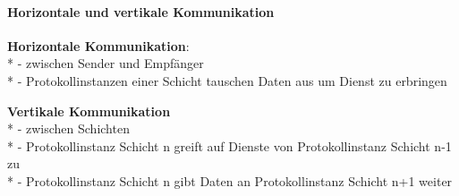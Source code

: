 \paragraph{Horizontale und vertikale Kommunikation}
\begin{items}
  \item \textbf{Horizontale Kommunikation}: \\*
    - zwischen Sender und Empfänger \\*
    - Protokollinstanzen einer Schicht tauschen Daten aus um Dienst zu erbringen
  \item \textbf{Vertikale Kommunikation} \\*
    - zwischen Schichten \\*
    - Protokollinstanz Schicht n greift auf Dienste von Protokollinstanz Schicht n-1 zu \\*
    - Protokollinstanz Schicht n gibt Daten an Protokollinstanz Schicht n+1 weiter
\end{items}


